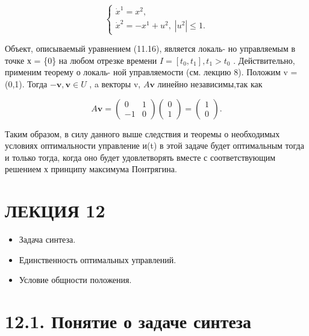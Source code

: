 \documentclass[8pt]{extarticle}
\begin{document}
\[
\left\{  \begin{array}{l} {\dot{x}}^{1} = {x}^{2}, \\  {\dot{x}}^{2} =  - {x}^{1} + {u}^{2},\;\left| {u}^{2}\right|  \leq  1. \end{array}\right. \tag{11.16}
\]

Объект, описываемый уравнением (11.16), является локаль- но управляемым в точке х = \{0\} на любом отрезке времени \(I = \left\lbrack  {{t}_{0},{t}_{1}}\right\rbrack  ,{t}_{1} > {t}_{0}\) . Действительно, применим теорему о локаль- ной управляемости (см. лекцию 8). Положим v = (0,1). Тогда \(- \mathbf{v},\mathbf{v} \in  U\) , a векторы v, \(A\mathbf{v}\) линейно независимы,так как

\[
A\mathbf{v} = \left( \begin{array}{cc} 0 & 1 \\   - 1 & 0 \end{array}\right) \left( \begin{array}{l} 0 \\  1 \end{array}\right)  = \left( \begin{array}{l} 1 \\  0 \end{array}\right) .
\]

Таким образом, в силу данного выше следствия и теоремы о необходимых условиях оптимальности управление и(t) в этой задаче будет оптимальным тогда и только тогда, когда оно будет удовлетворять вместе с соответствующим решением х принципу максимума Понтрягина.

\section*{ЛЕКЦИЯ 12}

\begin{itemize}\relax
\item\relax Задача синтеза.
\end{itemize}

\begin{itemize}\relax
\item\relax Единственность оптимальных управлений.
\end{itemize}

\begin{itemize}\relax
\item\relax Условие общности положения.
\end{itemize}

\section*{12.1. Понятие о задаче синтеза}
\end{document}
